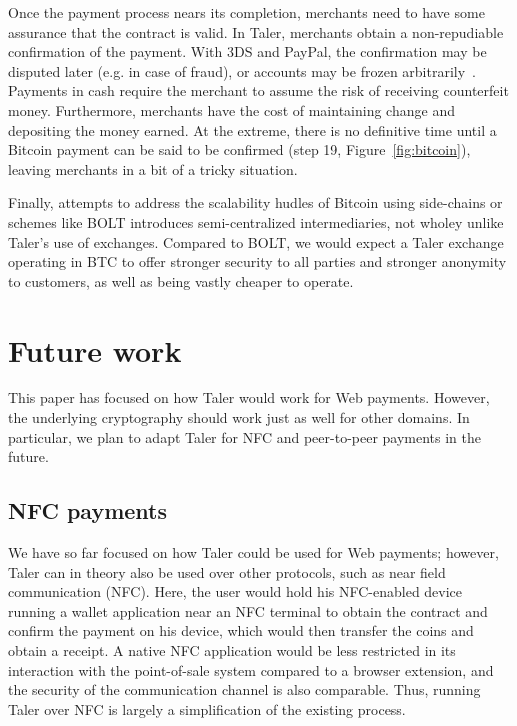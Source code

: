 \documentclass{llncs}
\begin{document}
Once the payment process nears its completion, merchants need to have
some assurance that the contract is valid.  In Taler, merchants
obtain a non-repudiable confirmation of the payment.  With 3DS and
PayPal, the confirmation may be disputed later (e.g. in case of
fraud), or accounts may be frozen arbitrarily~\cite{diaspora2011}.
Payments in cash require the merchant to assume the risk of receiving
counterfeit money.
Furthermore, merchants have the cost of maintaining change and depositing
the money earned.  At the extreme, there is no definitive time until a
Bitcoin payment can be said to be confirmed (step 19, Figure~\ref{fig:bitcoin}),
leaving merchants in a bit of a tricky situation.

Finally, attempts to address the scalability hudles of Bitcoin using
side-chains or schemes like BOLT introduces semi-centralized
intermediaries, not wholey unlike Taler's use of exchanges.  Compared
to BOLT, we would expect a Taler exchange operating in BTC to offer
stronger security to all parties and stronger anonymity to customers,
as well as being vastly cheaper to operate.


\section{Future work}

This paper has focused on how Taler would work for Web payments.
However, the underlying cryptography should work just as well for
other domains.  In particular, we plan to adapt Taler for NFC and
peer-to-peer payments in the future.

\subsection{NFC payments}

We have so far focused on how Taler could be used for Web payments;
however, Taler can in theory also be used over other protocols, such
as near field communication (NFC).  Here, the user would hold his
NFC-enabled device running a wallet application near an NFC terminal
to obtain the contract and confirm the payment on his device, which
would then transfer the coins and obtain a receipt.  A native NFC
application would be less restricted in its interaction with the
point-of-sale system compared to a browser extension, and the security
of the communication channel is also comparable. Thus, running
Taler over NFC is largely a simplification of the existing process.
\end{document}
